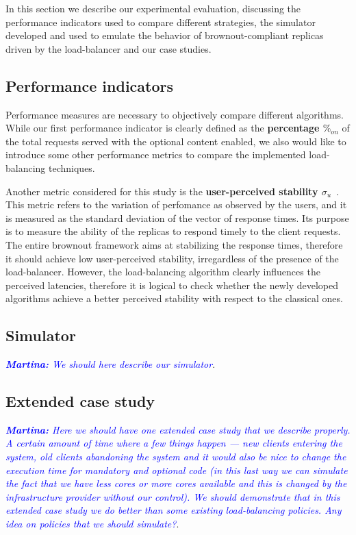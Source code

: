 In this section we describe our experimental evaluation, discussing
the performance indicators used to compare different strategies, the
simulator developed and used to emulate the behavior of
brownout-compliant replicas driven by the load-balancer and our case
studies.

\subsection{Performance indicators}

Performance measures are necessary to objectively compare different
algorithms. While our first performance indicator is clearly defined
as the \textbf{percentage $\%_{on}$} of the total requests served with
the optional content enabled, we also would like to introduce some
other performance metrics to compare the implemented load-balancing
techniques.

Another metric considered for this study is the \textbf{user-perceived
  stability $\sigma_u$}~\cite{GeograficalSASO}. This metric refers to
the variation of perfomance as observed by the users, and it is
measured as the standard deviation of the vector of response
times. Its purpose is to measure the ability of the replicas to
respond timely to the client requests. The entire brownout framework
aims at stabilizing the response times, therefore it should achieve
low user-perceived stability, irregardless of the presence of the
load-balancer. However, the load-balancing algorithm clearly
influences the perceived latencies, therefore it is logical to check
whether the newly developed algorithms achieve a better perceived
stability with respect to the classical ones.

\subsection{Simulator}

\textcolor{blue}{\textit{\textbf{Martina:} We should here describe our
    simulator}}.

\subsection{Extended case study}

\textcolor{blue}{\textit{\textbf{Martina:} Here we should have one
    extended case study that we describe properly. A certain amount of
    time where a few things happen --- new clients entering the
    system, old clients abandoning the system and it would also be
    nice to change the execution time for mandatory and optional code
    (in this last way we can simulate the fact that we have less cores
    or more cores available and this is changed by the infrastructure
    provider without our control). We should demonstrate that in this
    extended case study we do better than some existing load-balancing
    policies. Any idea on policies that we should simulate?}}.

